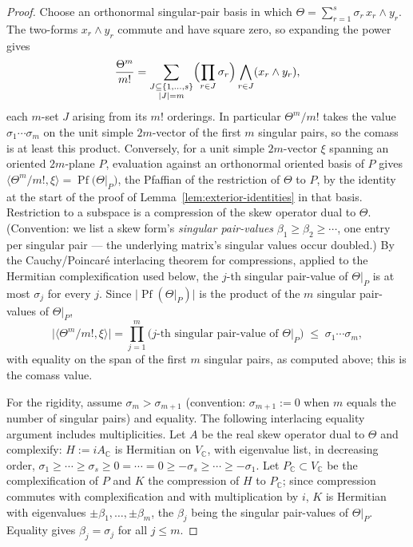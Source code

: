 \documentclass[11pt]{article}
\newcommand{\C}{\mathbb{C}}
\begin{document}
\begin{proof}
Choose an orthonormal singular-pair basis in which
\(\Theta=\sum_{r=1}^{s}\sigma_r\,x_r\wedge y_r\). The two-forms \(x_r\wedge y_r\) commute and
have square zero, so expanding the power gives
\[
  \frac{\Theta^m}{m!}
  =\sum_{\substack{J\subseteq\{1,\dots,s\}\\ |J|=m}}
   \Bigl(\prod_{r\in J}\sigma_r\Bigr)\bigwedge_{r\in J}(x_r\wedge y_r),
\]
each \(m\)-set \(J\) arising from its \(m!\) orderings. In particular
\(\Theta^m/m!\) takes the value \(\sigma_1\cdots\sigma_m\) on the unit simple
\(2m\)-vector of the first \(m\) singular pairs, so the comass is at least this
product. Conversely, for a unit simple \(2m\)-vector
\(\xi\) spanning an oriented \(2m\)-plane \(P\), evaluation against an orthonormal
oriented basis of \(P\) gives
\(\langle\Theta^m/m!,\xi\rangle=\operatorname{Pf}\!\bigl(\Theta|_P\bigr)\), the
Pfaffian of the restriction of \(\Theta\) to \(P\), by the identity at the start of the proof of
Lemma~\ref{lem:exterior-identities} in that basis. Restriction to a subspace is a
compression of the skew operator dual to \(\Theta\). (Convention: we list a skew
form's \emph{singular pair-values} \(\beta_1\ge\beta_2\ge\cdots\), one entry per
singular pair --- the underlying matrix's singular values occur doubled.) By the
Cauchy/Poincar\'e
interlacing theorem for compressions, applied to the Hermitian complexification
used below, the \(j\)-th singular pair-value of \(\Theta|_P\)
is at most \(\sigma_j\) for every \(j\). Since \(\bigl|\operatorname{Pf}(\Theta|_P)\bigr|\)
is the product of the \(m\) singular pair-values of \(\Theta|_P\),
\[
  \bigl|\langle\Theta^m/m!,\xi\rangle\bigr|
  =\prod_{j=1}^{m}\bigl(j\text{-th singular pair-value of }\Theta|_P\bigr)
  \;\le\;\sigma_1\cdots\sigma_m,
\]
with equality on the span of the first \(m\) singular pairs, as computed above; this is
the comass value.

For the rigidity, assume \(\sigma_m>\sigma_{m+1}\) (convention:
\(\sigma_{m+1}:=0\) when \(m\) equals the number of singular pairs) and
equality. The following interlacing equality argument includes multiplicities. Let \(A\) be the real skew operator dual to
\(\Theta\) and complexify: \(H:=iA_{\C}\) is Hermitian on \(V_{\C}\), with
eigenvalue list, in decreasing order,
\(\sigma_1\ge\cdots\ge\sigma_s\ge0=\cdots=0\ge-\sigma_s\ge\cdots\ge-\sigma_1\).
Let \(P_{\C}\subset V_{\C}\) be the complexification of \(P\) and \(K\) the
compression of \(H\) to \(P_{\C}\); since compression commutes with
complexification and with multiplication by \(i\), \(K\) is Hermitian with
eigenvalues \(\pm\beta_1,\dots,\pm\beta_m\), the \(\beta_j\) being the singular
pair-values of \(\Theta|_P\). Equality gives \(\beta_j=\sigma_j\) for all
\(j\le m\).


\end{proof}
\end{document}
